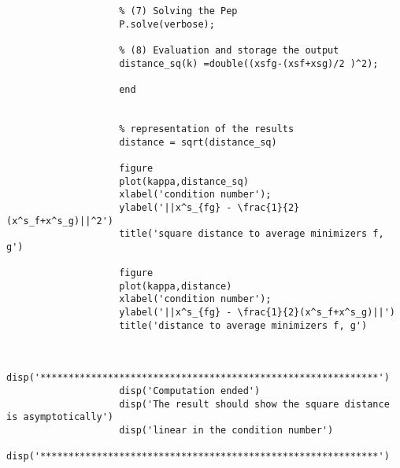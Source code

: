 \documentclass[11pt,a4paper]{article}
\begin{document}
\begin{lstlisting}
					% (7) Solving the Pep
					P.solve(verbose);
					
					% (8) Evaluation and storage the output
					distance_sq(k) =double((xsfg-(xsf+xsg)/2 )^2); 
					
					end
					
					
					% representation of the results
					distance = sqrt(distance_sq)
					
					figure
					plot(kappa,distance_sq)
					xlabel('condition number');
					ylabel('||x^s_{fg} - \frac{1}{2}(x^s_f+x^s_g)||^2')
					title('square distance to average minimizers f, g')
					
					figure
					plot(kappa,distance)
					xlabel('condition number');
					ylabel('||x^s_{fg} - \frac{1}{2}(x^s_f+x^s_g)||')
					title('distance to average minimizers f, g')
					
					
					disp('************************************************************')
					disp('Computation ended')
					disp('The result should show the square distance is asymptotically')
					disp('linear in the condition number')
					disp('************************************************************')
					
					\end{lstlisting}
					\clearpage
					
					{}
				
\end{document}

